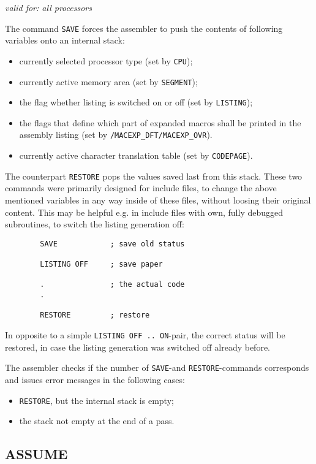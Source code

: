 \documentclass[12pt,twoside]{report}
\makeatletter
\newcommand{\tty}[1]{{\tt #1}}
\newcommand{\ttindex}[1]{\index{#1@{\tt #1}}}
\makeatother
\begin{document}
{\em valid for: all processors}

The command \tty{SAVE} forces the assembler to push the contents of
following variables onto an internal stack:
\begin{itemize}
\item{currently selected processor type (set by \tty{CPU});}
\item{currently active memory area (set by \tty{SEGMENT});}
\item{the flag whether listing is switched on or off (set by \tty{LISTING});}
\item{the flags that define which part of expanded macros shall be
      printed in the assembly listing (set by
      \tty{/MACEXP\_DFT/MACEXP\_OVR}).}
\item{currently active character translation table (set by
      \tty{CODEPAGE}).}
\end{itemize}
The counterpart \tty{RESTORE} pops the values saved last from this stack.
These two commands were primarily designed for include files, to change
the above mentioned variables in any way inside of these files, without
loosing their original content.  This may be helpful e.g. in include files
with own, fully debugged subroutines, to switch the listing generation
off:
\begin{verbatim}
        SAVE            ; save old status

        LISTING OFF     ; save paper

        .               ; the actual code
        .

        RESTORE         ; restore
\end{verbatim}
In opposite to a simple \tty{LISTING OFF .. ON}-pair, the correct status
will be restored, in case the listing generation was switched off already
before.

The assembler checks if the number of \tty{SAVE}-and
\tty{RESTORE}-commands corresponds and issues error messages in the
following cases:
\begin{itemize}
\item{\tty{RESTORE}, but the internal stack is empty;}
\item{the stack not empty at the end of a pass.}
\end{itemize}


\subsection{ASSUME}
\ttindex{ASSUME}
\end{document}
